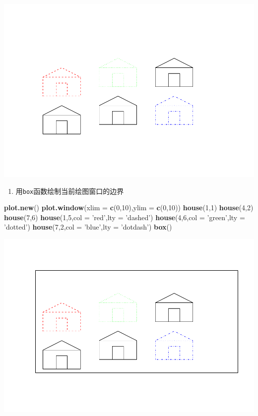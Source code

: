 \documentclass[]{article}
\newenvironment{Shaded}{\begin{snugshade}}{\end{snugshade}}
\newcommand{\DataTypeTok}[1]{\textcolor[rgb]{0.13,0.29,0.53}{#1}}
\newcommand{\DecValTok}[1]{\textcolor[rgb]{0.00,0.00,0.81}{#1}}
\newcommand{\KeywordTok}[1]{\textcolor[rgb]{0.13,0.29,0.53}{\textbf{#1}}}
\newcommand{\NormalTok}[1]{#1}
\newcommand{\StringTok}[1]{\textcolor[rgb]{0.31,0.60,0.02}{#1}}
\providecommand{\tightlist}{%
  \setlength{\itemsep}{0pt}\setlength{\parskip}{0pt}}
\begin{document}
\includegraphics{Homework_4_files/figure-latex/unnamed-chunk-4-1.pdf}

\begin{enumerate}
\def\labelenumi{\alph{enumi}.}
\setcounter{enumi}{4}
\tightlist
\item
  用\texttt{box}函数绘制当前绘图窗口的边界
\end{enumerate}

\begin{Shaded}
\begin{Highlighting}[]
\KeywordTok{plot.new}\NormalTok{()}
\KeywordTok{plot.window}\NormalTok{(}\DataTypeTok{xlim =} \KeywordTok{c}\NormalTok{(}\DecValTok{0}\NormalTok{,}\DecValTok{10}\NormalTok{),}\DataTypeTok{ylim =} \KeywordTok{c}\NormalTok{(}\DecValTok{0}\NormalTok{,}\DecValTok{10}\NormalTok{))}
\KeywordTok{house}\NormalTok{(}\DecValTok{1}\NormalTok{,}\DecValTok{1}\NormalTok{)}
\KeywordTok{house}\NormalTok{(}\DecValTok{4}\NormalTok{,}\DecValTok{2}\NormalTok{)}
\KeywordTok{house}\NormalTok{(}\DecValTok{7}\NormalTok{,}\DecValTok{6}\NormalTok{)}
\KeywordTok{house}\NormalTok{(}\DecValTok{1}\NormalTok{,}\DecValTok{5}\NormalTok{,}\DataTypeTok{col =} \StringTok{'red'}\NormalTok{,}\DataTypeTok{lty =} \StringTok{'dashed'}\NormalTok{)}
\KeywordTok{house}\NormalTok{(}\DecValTok{4}\NormalTok{,}\DecValTok{6}\NormalTok{,}\DataTypeTok{col =} \StringTok{'green'}\NormalTok{,}\DataTypeTok{lty =} \StringTok{'dotted'}\NormalTok{)}
\KeywordTok{house}\NormalTok{(}\DecValTok{7}\NormalTok{,}\DecValTok{2}\NormalTok{,}\DataTypeTok{col =} \StringTok{'blue'}\NormalTok{,}\DataTypeTok{lty =} \StringTok{'dotdash'}\NormalTok{)}
\KeywordTok{box}\NormalTok{()}
\end{Highlighting}
\end{Shaded}

\includegraphics{Homework_4_files/figure-latex/unnamed-chunk-5-1.pdf}
\end{document}
